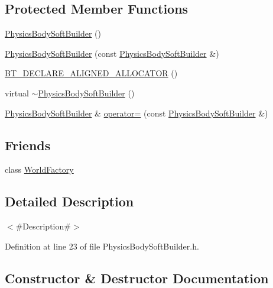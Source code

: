 \subsection*{Protected Member Functions}
\begin{DoxyCompactItemize}
\item 
\mbox{\hyperlink{classnjli_1_1_physics_body_soft_builder_a236eaa31424b4c13346922855bc0935f}{Physics\+Body\+Soft\+Builder}} ()
\item 
\mbox{\hyperlink{classnjli_1_1_physics_body_soft_builder_aaef6b31296d9d22591a7d753467585db}{Physics\+Body\+Soft\+Builder}} (const \mbox{\hyperlink{classnjli_1_1_physics_body_soft_builder}{Physics\+Body\+Soft\+Builder}} \&)
\item 
\mbox{\hyperlink{classnjli_1_1_physics_body_soft_builder_adac7505e498438c51e3d6b0e66807d63}{B\+T\+\_\+\+D\+E\+C\+L\+A\+R\+E\+\_\+\+A\+L\+I\+G\+N\+E\+D\+\_\+\+A\+L\+L\+O\+C\+A\+T\+OR}} ()
\item 
virtual \mbox{\hyperlink{classnjli_1_1_physics_body_soft_builder_aa8c593175f58bb8043978462515550c3}{$\sim$\+Physics\+Body\+Soft\+Builder}} ()
\item 
\mbox{\hyperlink{classnjli_1_1_physics_body_soft_builder}{Physics\+Body\+Soft\+Builder}} \& \mbox{\hyperlink{classnjli_1_1_physics_body_soft_builder_abf6ae90c8e59320950bfc550ed6ade26}{operator=}} (const \mbox{\hyperlink{classnjli_1_1_physics_body_soft_builder}{Physics\+Body\+Soft\+Builder}} \&)
\end{DoxyCompactItemize}
\subsection*{Friends}
\begin{DoxyCompactItemize}
\item 
class \mbox{\hyperlink{classnjli_1_1_physics_body_soft_builder_acb96ebb09abe8f2a37a915a842babfac}{World\+Factory}}
\end{DoxyCompactItemize}


\subsection{Detailed Description}
$<$\#\+Description\#$>$ 

Definition at line 23 of file Physics\+Body\+Soft\+Builder.\+h.



\subsection{Constructor \& Destructor Documentation}
\mbox{\label{classnjli_1_1_physics_body_soft_builder_a236eaa31424b4c13346922855bc0935f}} 

